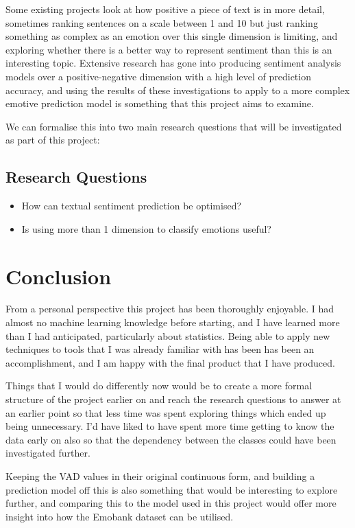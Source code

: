 \documentclass[11pt]{article}
\begin{document}
Some existing projects look at how positive a piece of text is in more detail, sometimes ranking sentences on a scale between 1 and 10 but just ranking something as complex as an emotion over this single dimension is limiting, and exploring whether there is a better way to represent sentiment than this is an interesting topic.
Extensive research has gone into producing sentiment analysis models over a positive-negative dimension with a high level of prediction accuracy, and using the results of these investigations to apply to a more complex emotive prediction model is something that this project aims to examine.

We can formalise this into two main research questions that will be investigated as part of this project:

\subsection{Research Questions}
\begin{itemize}
    \item How can textual sentiment prediction be optimised?
    \item Is using more than 1 dimension to classify emotions useful?
\end{itemize}
\pagebreak


\section{Conclusion}

From a personal perspective this project has been thoroughly enjoyable. I had almost no machine learning knowledge before starting, and I have learned more than I had anticipated, particularly about statistics. Being able to apply new techniques to tools that I was already familiar with has been has been an accomplishment, and I am happy with the final product that I have produced. 

Things that I would do differently now would be to create a more formal structure of the project earlier on and reach the research questions to answer at an earlier point so that less time was spent exploring things which ended up being unnecessary. I'd have liked to have spent more time getting to know the data early on also so that the dependency between the classes could have been investigated further. 

Keeping the VAD values in their original continuous form, and building a prediction model off this is also something that would be interesting to explore further, and comparing this to the model used in this project would offer more insight into how the Emobank dataset can be utilised.
\end{document}
